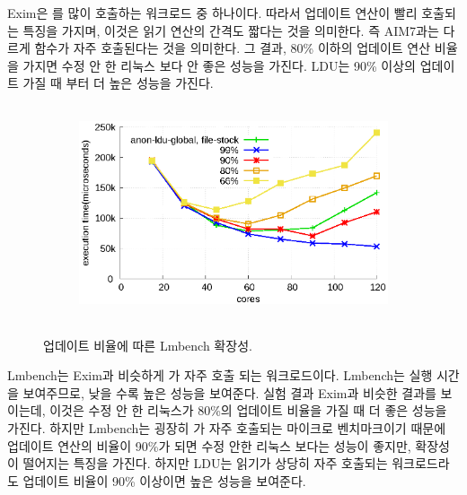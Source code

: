 Exim은 를 많이 호출하는 워크로드 중 하나이다. 
따라서 업데이트 연산이 빨리 호출되는 특징을 가지며, 이것은 읽기 연산의 간격도 짧다는 것을 의미한다.
즉 AIM7과는 다르게  함수가 자주 호출된다는 것을 의미한다.
그 결과, 80\% 이하의 업데이트 연산 비율을 가지면 수정 안 한 리눅스 보다 안 좋은 성능을 가진다.
LDU는 90\% 이상의 업데이트 가질 때 부터 더 높은 성능을 가진다.

\begin{figure}[h!]
    \centering
    \begin{subfigure}[b]{1\textwidth}
        \includegraphics[height=2.5in]{graph/ratio_lmbench_core.eps}
    \end{subfigure}%
    \caption{업데이트 비율에 따른 Lmbench 확장성.}
    \label{fig:UpdateRate_lmbench_2}
\end{figure}

Lmbench는 Exim과 비슷하게 가 자주 호출 되는 워크로드이다.
Lmbench는 실행 시간을 보여주므로, 낮을 수록 높은 성능을 보여준다. 
실험 결과 Exim과 비슷한 결과를 보이는데, 이것은 수정 안 한 리눅스가 80\%의 업데이트 
비율을 가질 때 더 좋은 성능을 가진다.
하지만 Lmbench는 굉장히 가 자주 호출되는 마이크로 벤치마크이기 때문에 업데이트 연산의 비율이 
90\%가 되면 수정 안한 리눅스 보다는 성능이 좋지만, 확장성이 떨어지는 특징을 가진다.
하지만 LDU는 읽기가 상당히 자주 호출되는 워크로드라도 업데이트 비율이 90\% 이상이면 
높은 성능을 보여준다.
 
